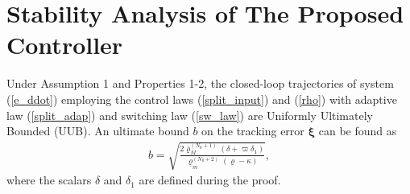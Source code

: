 \documentclass[AMA,STIX1COL,sort, compress]{WileyNJD-v2}
\begin{document}
\section{Stability Analysis of The Proposed Controller}
\begin{theorem}
	Under Assumption 1 and Properties 1-2, the closed-loop trajectories of system (\ref{e_ddot}) employing the control laws (\ref{split_input}) and (\ref{rho}) with adaptive law (\ref{split_adap}) and switching law (\ref{sw_law}) are Uniformly Ultimately Bounded (UUB). An ultimate bound $b$ on the tracking error $\boldsymbol \xi$ can be found as
	\begin{align}
	b = \sqrt{\frac{{2\bar{\varrho}_M^{(N_0+1)}} \left( \delta + \varpi \delta_1 \right ) }{ {{\underline{\varrho}_m^{(N_0+2)}\left( \varrho - \kappa \right)}} }}, \label{bound} 
	\end{align}
	where the scalars $\delta$ and $\delta_1$ are defined during the proof.
\end{theorem}
\end{document}
